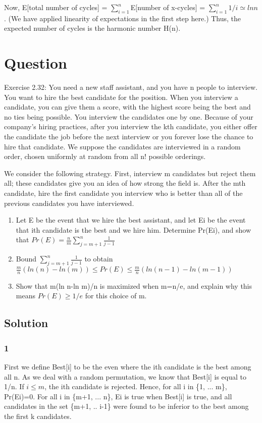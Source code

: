 \documentclass[10pt]{article}
\begin{document}
Now, E[total number of cycles] = $\sum_{i=1}^{n}$E[number of x-cycles] = $\sum_{i=1}^{n}1/i \simeq ln n$. (We have applied linearity of expectations in the first step here.) Thus, the expected number of cycles is the harmonic number H(n).

\section{Question}

Exercise 2.32: You need a new staff assistant, and you have n people to interview. You want to hire the best candidate for the position. When you interview a candidate, you can give them a score, with the highest score being the best and no ties being possible. You interview the candidates one by one. Because of your company's hiring practices, after you interview the kth candidate, you either offer the candidate the job before the next interview or you forever lose the chance to hire that candidate. We suppose the candidates are interviewed in a random order, chosen uniformly at random from all n! possible orderings.

We consider the following strategy. First, interview m candidates but reject them all; these candidates give you an idea of how strong the field is. After the mth candidate, hire the first candidate you interview who is better than all of the previous candidates you have interviewed.

\begin{enumerate}
\item Let E be the event that we hire the best assistant, and let Ei be the event that ith candidate is the best and we hire him. Determine Pr(Ei), and show that
      $Pr(E)=\frac{n}{m}\sum_{j=m+1}^{n}\frac{1}{j-1}$

\item Bound $\sum_{j=m+1}^{n}\frac{1}{j-1}$ to obtain
      $\frac{m}{n}(ln(n) - ln(m)) \leq Pr(E) \leq \frac{m}{n}(ln (n-1) - ln (m-1))$

\item Show that m(ln n-ln m)/n is maximized when m=n/e, and explain why this means $Pr(E)\geq 1/e$ for this choice of m.
\end{enumerate}

\subsection{Solution}

\subsubsection*{1} First we define Best[i] to be the even where the ith candidate is the best among all n. As we deal with a random permutation, we know that Best[i] is equal to 1/n. If $i\leq m$, the ith candidate is rejected. Hence, for all i in \{1, ... m\}, Pr(Ei)=0. For all i in \{m+1, ... n\}, Ei is true when Best[i] is true, and all candidates in the set \{m+1, .. i-1\} were found to be inferior to the best among the first k candidates.
\end{document}
